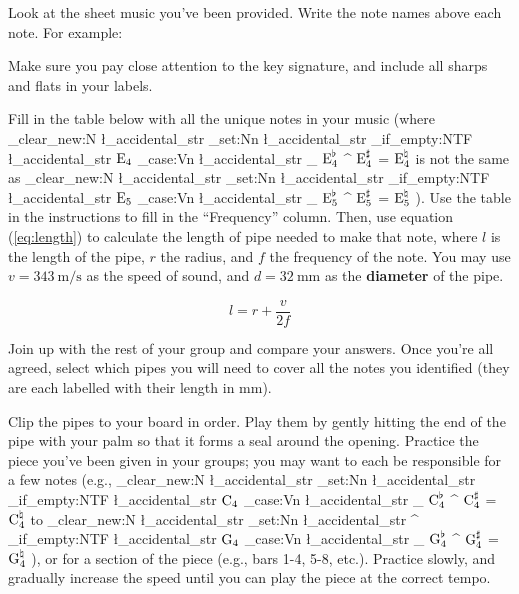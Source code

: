 \documentclass{article}
\newcommand{\notename}[3][]{
    \str_clear_new:N \l_accidental_str%
    \str_set:Nn \l_accidental_str {#1}%
    \str_if_empty:NTF \l_accidental_str {
        \ensuremath{\text{#2}\sb{#3}}%
    }{
        \str_case:Vn \l_accidental_str {%
            {_} {\ensuremath{\text{#2}^{\flat}\sb{#3}}}%
            {^} {\ensuremath{\text{#2}^{\sharp}\sb{#3}}}%
            {=} {\ensuremath{\text{#2}^{\natural}\sb{#3}}}%
        }
    }
}
\begin{document}
\task{}

\subtask{}

Look at the sheet music you've been provided. Write the note names above each note. For example:



\vspace{-1cm}
Make sure you pay close attention to the key signature, and include all sharps and flats in your labels.

\subtask{}

Fill in the table below with all the unique notes in your music (where \notename{E}{4} is not the same as \notename{E}{5}). Use the table in the instructions to fill in the ``Frequency'' column. Then, use equation (\ref{eq:length}) to calculate the length of pipe needed to make that note, where $l$ is the length of the pipe, $r$ the radius, and $f$ the frequency of the note. You may use $v = \SI{343}{\meter\per\second}$ as the speed of sound, and $d = \SI{32}{\milli\meter}$ as the \textbf{diameter} of the pipe.

\begin{equation}
    l = r + \frac{v}{2f} \label{eq:length}
\end{equation}

\begin{multicols}{2}
\end{multicols}

\task{}

Join up with the rest of your group and compare your answers. Once you're all agreed, select which pipes you will need to cover all the notes you identified (they are each labelled with their length in \si{\milli\meter}).

Clip the pipes to your board in order. Play them by gently hitting the end of the pipe with your palm so that it forms a seal around the opening. Practice the piece you've been given in your groups; you may want to each be responsible for a few notes (e.g., \notename{C}{4} to \notename[^]{G}{4}), or for a section of the piece (e.g., bars 1-4, 5-8, etc.). Practice slowly, and gradually increase the speed until you can play the piece at the correct tempo. 
\end{document}
